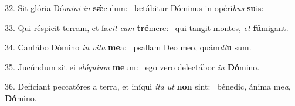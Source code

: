 32. Sit glória Dó\textit{mi}\textit{ni} \textit{in} \textbf{sǽ}culum: \ast\  lætábitur Dóminus in opéri\textit{bus} \textbf{su}is:\

33. Qui réspicit terram, et fa\textit{cit} \textit{e}\textit{am} \textbf{tré}mere: \ast\  qui tangit montes, \textit{et} \textbf{fú}migant.\

34. Cantábo Dómino \textit{in} \textit{vi}\textit{ta} \textbf{me}a: \ast\  psallam Deo meo, quám\textit{di}\textbf{u} sum.\

35. Jucúndum sit ei e\textit{ló}\textit{qui}\textit{um} \textbf{me}um: \ast\  ego vero delectábor \textit{in} \textbf{Dó}mino.\

36. Defíciant peccatóres a terra, et iníqui \textit{i}\textit{ta} \textit{ut} \textbf{non} sint: \ast\  bénedic, ánima me\textit{a}, \textbf{Dó}mino.\

